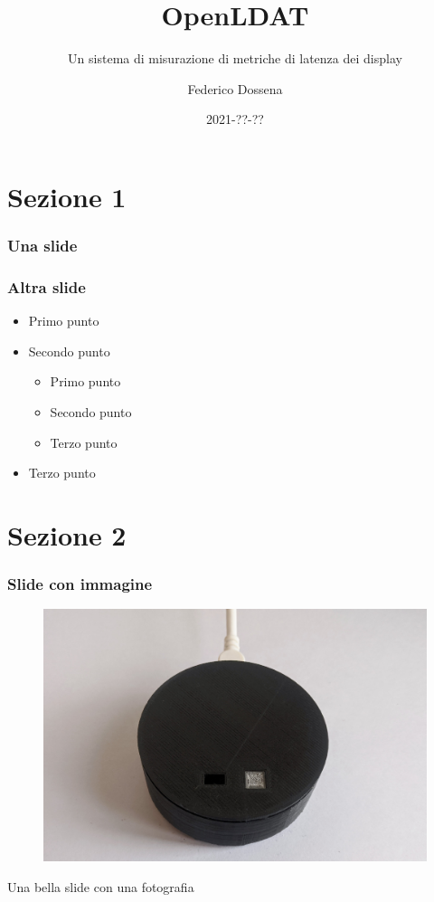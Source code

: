 \documentclass{beamer}
\title{OpenLDAT}
\subtitle{Un sistema di misurazione di metriche di latenza dei display}
\author{Federico Dossena}
\institute{Università degli Studi di Milano}
\date{2021-??-??}
\begin{document}
	
\begin{frame}
	\titlepage
\end{frame}

\section{Sezione 1}
\begin{frame}
\frametitle{Una slide}
\lipsum[2]
\end{frame}

\begin{frame}
	\frametitle{Altra slide}
	\begin{itemize}
		\item Primo punto
		\item Secondo punto \begin{itemize}
			\item Primo punto
			\item Secondo punto
			\item Terzo punto
		\end{itemize}
		\item Terzo punto
	\end{itemize}
\end{frame}

\section{Sezione 2}
\begin{frame}
	\frametitle{Slide con immagine}
	\begin{figure}
		\includegraphics[scale=0.5]{Dispositivo_files/assembly_15.jpg}
	\end{figure}
	Una bella slide con una fotografia
\end{frame}
\end{document}
